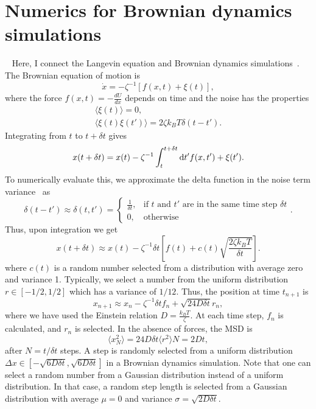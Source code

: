\chapter{Numerics for Brownian dynamics simulations}~\label{appx:brownian_dyn_sim}
Here, I connect the Langevin equation and Brownian dynamics
simulations~\cite{grassia_computer_95}.  The Brownian equation of motion is
%
\begin{equation}
  \dot{x} = - \zeta ^{-1} \left[  f(x,t) + \xi(t) \right],
\end{equation}
%
where the force $ f(x,t) = -\frac{dU}{dx}  $ depends on time and the noise has
the properties
\begin{gather}
  \langle \xi( t ) \rangle = 0,\\
  \label{eqn:noise_delta}
  \langle \xi( t ) \xi( t') \rangle 
  = 2 \zeta k_B T \delta(t-t').
\end{gather}
%
Integrating from $t$ to $t+\delta t$ gives
%
\begin{equation}
  x(t+\delta t) = x(t) - \zeta ^{-1} 
  \int_t^{t+\delta t} \mathop{}\!\mathrm{d} t' f(x,t') + \xi(t').
\end{equation}
%
To numerically evaluate this, we approximate the delta function in the
noise term variance~ as
%
\begin{equation}
  \delta(t-t') \approx \delta(t,t') = 
  \begin{cases}
    \frac{1}{\delta t}, &\text{if $t$ and $t'$ are in the same
  time step $\delta t$} \\
    0, & \text{otherwise}
  \end{cases}.
\end{equation}
%
Thus, upon integration we get
%
\begin{equation}
  x(t+\delta t) \approx x(t) - \zeta ^{-1} 
  \delta t \left[ f(t) + c(t) \sqrt{\frac{2 \zeta k_B T}{\delta t}}  \right].
\end{equation}
%
where $c(t)$ is a random number selected from a distribution with average zero
and variance 1.  Typically, we select a number from the uniform distribution
$r \in [-1/2, 1/2] $ which has a variance of $1/12$.  Thus, the position at time
$t_{n+1}$ is
%
\begin{equation}
   x_{n+1} \approx x_{n} - \zeta ^{-1} 
  \delta t f_n + \sqrt{24 D \delta t} r_n,
\end{equation}
%
where we have used the Einstein relation $D = \frac{k_B T}{\zeta}$. At each time
step, $f_n$ is calculated, and $r_n$ is selected.  In the absence of forces, the
MSD is
%
\begin{equation}
   \langle x_{N} ^2  \rangle = 24 D \delta t \langle r^2 \rangle N = 2Dt,
\end{equation}
%
after $N = t / \delta t$ steps.  A step is randomly selected from a uniform
distribution  $\Delta x \in [ -\sqrt{6 D \delta t}, \sqrt{6 D \delta t} ] $ in a
Brownian dynamics simulation.  Note that one can select a random
number from a Gaussian distribution instead of a uniform distribution.  In that
case, a random step length is selected from a Gaussian distribution with average
$\mu = 0$ and variance $\sigma = \sqrt{2 D \delta t }$. 
